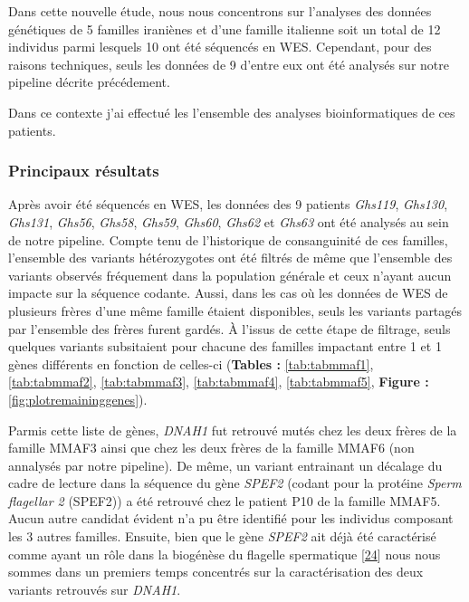 \documentclass[12pt,twoside]{ugathesis}
\begin{document}
Dans cette nouvelle étude, nous nous concentrons sur l'analyses des
données génétiques de 5 familles iraniènes et d'une famille italienne
soit un total de 12 individus parmi lesquels 10 ont été séquencés en
WES. Cependant, pour des raisons techniques, seuls les données de 9
d'entre eux ont été analysés sur notre pipeline décrite précédement.

Dans ce contexte j'ai effectué les l'ensemble des analyses
bioinformatiques de ces patients.

\newpage



\newpage

\subsubsection{Principaux résultats}\label{principaux-resultats-2}

Après avoir été séquencés en WES, les données des 9 patients
\emph{Ghs119}, \emph{Ghs130}, \emph{Ghs131}, \emph{Ghs56}, \emph{Ghs58},
\emph{Ghs59}, \emph{Ghs60}, \emph{Ghs62} et \emph{Ghs63} ont été
analysés au sein de notre pipeline. Compte tenu de l'historique de
consanguinité de ces familles, l'ensemble des variants hétérozygotes ont
été filtrés de même que l'ensemble des variants observés fréquement dans
la population générale et ceux n'ayant aucun impacte sur la séquence
codante. Aussi, dans les cas où les données de WES de plusieurs frères
d'une même famille étaient disponibles, seuls les variants partagés par
l'ensemble des frères furent gardés. À l'issus de cette étape de
filtrage, seuls quelques variants subsitaient pour chacune des familles
impactant entre 1 et 1 gènes différents en fonction de celles-ci
(\textbf{Tables :} \ref{tab:tabmmaf1}, \ref{tab:tabmmaf2},
\ref{tab:tabmmaf3}, \ref{tab:tabmmaf4}, \ref{tab:tabmmaf5},
\textbf{Figure : }\ref{fig:plotremaininggenes}).

Parmis cette liste de gènes, \emph{DNAH1} fut retrouvé mutés chez les
deux frères de la famille MMAF3 ainsi que chez les deux frères de la
famille MMAF6 (non annalysés par notre pipeline). De même, un variant
entrainant un décalage du cadre de lecture dans la séquence du gène
\emph{SPEF2} (codant pour la protéine \emph{Sperm flagellar 2} (SPEF2))
a été retrouvé chez le patient P10 de la famille MMAF5. Aucun autre
candidat évident n'a pu être identifié pour les individus composant les
3 autres familles. Ensuite, bien que le gène \emph{SPEF2} ait déjà été
caractérisé comme ayant un rôle dans la biogénèse du flagelle
spermatique {[}\protect\hyperlink{ref-Lehti2017}{24}{]} nous nous sommes
dans un premiers temps concentrés sur la caractérisation des deux
variants retrouvés sur \emph{DNAH1}.
\end{document}
